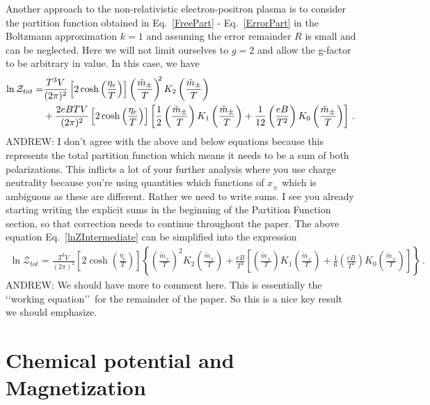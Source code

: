 \documentclass[Universe,article,submit,moreauthors,pdftex]{Definitions/mdpi}
\newcommand*{\req}[1]{Eq.~{\eqref{#1}}}
\begin{document}
Another approach to the non-relativistic electron-positron plasma is to consider the partition function obtained in \req{FreePart} - \req{ErrorPart} in the Boltzmann approximation $k=1$ and assuming the error remainder $R$ is small and can be neglected. Here we will not limit ourselves to $g=2$ and allow the g-factor to be arbitrary in value. In this case, we have
\begin{align}
  \label{lnZIntermediate}\ln\mathcal{Z}_{tot}=&\frac{T^3V}{(2\pi)^2}\left[2\cosh\left(\frac{\eta_{e}}{T}\right)\right]\left(\frac{\tilde m_\pm}{T}\right)^{\!\!2} K_2\left(\frac{\tilde{m}_{\pm}}{T}\right)\notag\\
  &+\frac{2eBTV}{(2\pi)^2}\left[2\cosh\left(\frac{\eta_{e}}{T}\right)\right]\left[\frac{1}{2}\left(\frac{\tilde m_\pm}{T}\right)K_1\left(\frac{\tilde{m}_{\pm}}{T}\right)+\frac{1}{12}\left(\frac{eB}{T^2}\right)K_0\left(\frac{\tilde{m}_{\pm}}{T}\right)\right]\,.
\end{align}
{\color{red}ANDREW: I don't agree with the above and below equations because this represents the total partition function which means it needs to be a sum of both polarizations. This inflicts a lot of your further analysis where you use charge neutrality because you're using quantities which functions of $x_{\pm}$ which is ambiguous as these are different. Rather we need to write sums. I see you already starting writing the explicit sums in the beginning of the Partition Function section, so that correction needs to continue throughout the paper.} The above equation \req{lnZIntermediate} can be simplified into the expression
\begin{align}
  \label{lnZ}\ln\mathcal{Z}_{tot}=\frac{T^3V}{(2\pi)^2}\left[2\cosh\left(\frac{\eta_{e}}{T}\right)\right]\left\{\left(\frac{\tilde m_\pm}{T}\right)^{\!\!2} K_2\left(\frac{\tilde{m}_{\pm}}{T}\right)+\frac{eB}{T^2} \left[\left(\frac{\tilde m_\pm}{T}\right)K_1\left(\frac{\tilde{m}_{\pm}}{T}\right)+\frac{1}{6}\left(\frac{eB}{T^2}\right)K_0\left(\frac{\tilde{m}_{\pm}}{T}\right)\right]\right\}\,.
\end{align}
{\color{red}ANDREW: We should have more to comment here. This is essentially the \lq\lq working equation\rq\rq\ for the remainder of the paper. So this is a nice key result we should emphasize.}
\section{Chemical potential and Magnetization}
\end{document}
